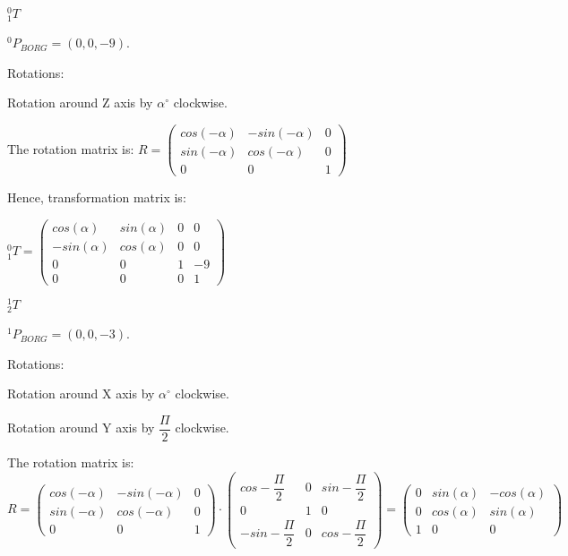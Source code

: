 \documentclass[12pt]{article}
\begin{document}
\begin{list}{)~}{}
\item
$_{1}^{0}T$

$^0 P_{BORG} = \left(0, 0, -9\right)$.

Rotations:

\begin{list}{)~}{}
\item
Rotation around Z axis by $\alpha^\circ$ clockwise.
\end{list}

The rotation matrix is:
$R=\left(\begin{array}{ccc}
cos\left(-\alpha\right) & -sin\left(-\alpha\right) & 0 \\
sin\left(-\alpha\right) & cos\left(-\alpha\right) & 0\\
0 & 0 & 1\end{array}\right)$

Hence, transformation matrix is:

$_{1}^{0}T = \left(\begin{array}{cccc}
cos\left(\alpha\right) & sin\left(\alpha\right) & 0 & 0 \\
-sin\left(\alpha\right) & cos\left(\alpha\right) & 0 & 0\\
0 & 0 & 1 & -9\\
0 & 0 & 0 & 1\end{array}\right)$

\item
$_{2}^{1}T$

$^1 P_{BORG} = \left(0, 0, -3\right)$.

Rotations:

\begin{list}{)~}{}
\item Rotation around X axis by $\alpha^\circ$ clockwise.
\item Rotation around Y axis by $\dfrac{\Pi}{2}$ clockwise.
\end{list}

The rotation matrix is:
$R=\left(\begin{array}{ccc}
cos\left(-\alpha\right) & -sin\left(-\alpha\right) & 0 \\
sin\left(-\alpha\right) & cos\left(-\alpha\right) & 0\\
0 & 0 & 1\end{array}\right)\cdot
\left(\begin{array}{ccc}
cos -\dfrac{\Pi}{2} & 0 & sin -\dfrac{\Pi}{2} \\
0 & 1 & 0\\
-sin -\dfrac{\Pi}{2} & 0 & cos -\dfrac{\Pi}{2} \end{array}\right) =\left(\begin{array}{ccc}
0 & sin\left(\alpha\right) & -cos\left(\alpha\right) \\
0 & cos\left(\alpha\right) & sin\left(\alpha\right)\\
1 & 0 & 0\end{array}\right)$


\end{list}
\end{document}
